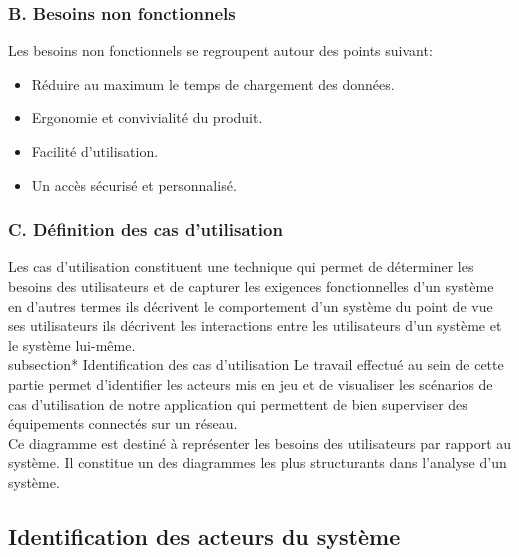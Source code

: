 \subsubsection{B. Besoins non fonctionnels}
Les besoins non fonctionnels se regroupent autour des points suivant:
\begin{itemize}
\item Réduire au maximum le temps de chargement des données.
\item Ergonomie et convivialité du produit.
\item Facilité d'utilisation.
\item Un accès sécurisé et  personnalisé.
\end{itemize}






\subsubsection{C. Définition  des  cas d'utilisation }
Les cas d'utilisation constituent une technique qui permet de déterminer les besoins des utilisateurs et de capturer les exigences fonctionnelles d'un système en d'autres termes ils décrivent le comportement d'un système du point de vue ses utilisateurs ils décrivent les  interactions entre les utilisateurs d'un système et le système lui-même.
\\subsection*{  Identification des cas d'utilisation}
Le travail effectué au sein de cette partie permet d'identifier les acteurs mis en jeu et de visualiser les scénarios de cas d'utilisation de notre application qui permettent de bien superviser des équipements connectés sur un réseau.\\
Ce diagramme est destiné à représenter les besoins des utilisateurs par rapport au système. Il constitue un des diagrammes les plus structurants dans l'analyse d'un système.
\subsection*{ Identification des acteurs du système \\ }

